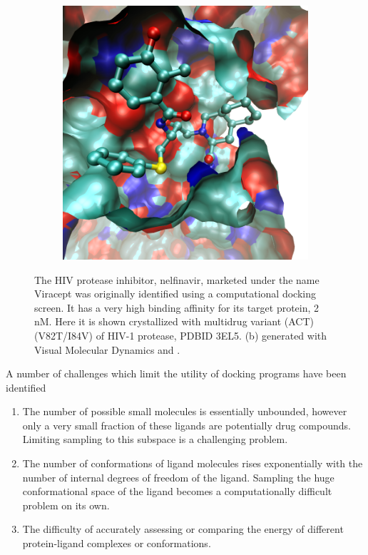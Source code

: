 \begin{figure}[h]
\begin{subfigure}[b]{0.3\textwidth}
        \includegraphics[width=\textwidth]{figures/complexed_nelfinavir_white.png}
        \label{fig:nelfinavir_docked}
        \caption{}
    \end{subfigure}
    \label{fig:nelfinavir}
    \caption{
The HIV protease inhibitor, nelfinavir, marketed under the name Viracept was originally identified using a computational docking screen.
It has a very high binding affinity for its target protein, 2 nM.
Here it is shown crystallized with multidrug variant (ACT) (V82T/I84V) of HIV-1 protease, PDBID 3EL5.
(b) generated with Visual Molecular Dynamics \protect\cite{humphrey1996vmd} and \protect\cite{povray}.
}
\end{figure}
A number of challenges which limit the utility of docking programs have been identified
\begin{enumerate}
\item The number of possible small molecules is essentially unbounded, however only a very small fraction of these ligands are potentially drug compounds. Limiting sampling to this subspace is a challenging problem.
\item The number of conformations of ligand molecules rises exponentially with the number of internal degrees of freedom of the ligand. Sampling the huge conformational space of the ligand becomes a computationally difficult problem on its own.
\item The difficulty of accurately assessing or comparing the energy of different protein-ligand complexes or conformations\cite{shoichet2004virtual}.
\end{enumerate}

